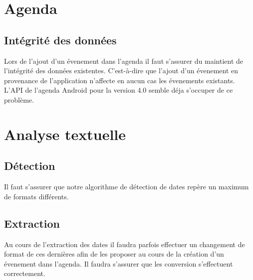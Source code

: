\documentclass [pdftex,12pt] {report}
\begin{document}
  \section{Agenda}
    \subsection{Intégrité des données}
      Lors de l'ajout d'un évenement dans l'agenda il faut s'assurer du maintient de l'intégrité des données existentes. C'est-à-dire que l'ajout d'un évenement en provenance de l'application n'affecte en aucun cas les évenements existants. L'API de l'agenda Android pour la version 4.0 semble déja s'occuper de ce problème.

  \section{Analyse textuelle}
    \subsection{Détection}
      Il faut s'assurer que notre algorithme de détection de dates repère un maximum de formats différents.

    \subsection{Extraction}
      Au cours de l'extraction des dates il faudra parfois effectuer un changement de format de ces dernières afin de les proposer au cours de la création d'un évenement dans l'agenda. Il faudra s'assurer que les conversion s'effectuent correctement.
    


\end{document}
